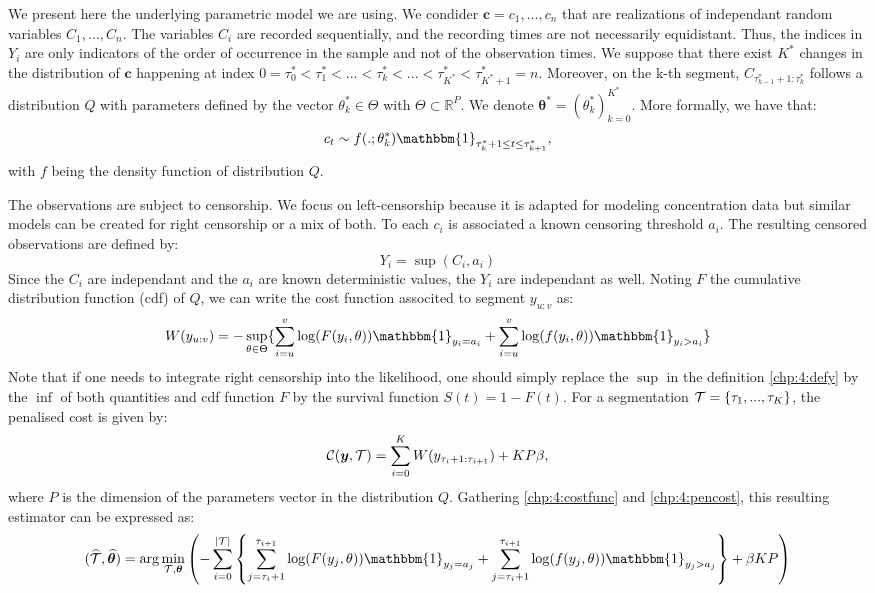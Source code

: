 We present here the underlying parametric model we are using. We condider $\bm c = c_1,\dots,c_n$ that are realizations of independant random variables $C_1,\dots,C_n$. The variables $C_i$ are recorded sequentially, and the recording times are not necessarily equidistant. Thus, the indices in $Y_i$ are only indicators of the order of occurrence in the sample and not of the observation times. We suppose that there exist $K^*$ changes in the distribution of $\bm c$ happening at index $0=\tau_0^*<\tau^*_1 <... < \tau^*_k <... < \tau^*_{K^*}<\tau^*_{K^*+1}=n$. Moreover, on the k-th segment, $C_{\tau^*_{k-1}+1:\tau^*_{k}}$ follows a distribution $Q$ with parameters defined by the vector $\theta^*_k\in\Theta$ with $\Theta\subset\mathbb{R}^P$. We denote $\bm{\theta^*} = (\theta^*_k)_{k=0}^{K^*}$. More formally, we have that:  
$$c_t \sim f(.;\theta^*_k)\mathbbm{1}_{\tau^*_{k}+1\leq t \leq \tau^*_{k+1}},$$
with $f$ being the density function of distribution $Q$.  


The observations are subject to censorship. We focus on left-censorship because it is adapted for modeling concentration data but similar models can be created for right censorship or a mix of both. To each $c_i$ is associated a known censoring threshold $a_i$. The resulting censored observations are defined by:  
\begin{equation}\label{chp:4:defy}
Y_i = \sup(C_i,a_i)
\end{equation}
Since the $C_i$ are independant and the $a_i$ are known deterministic values, the $Y_i$ are independant as well. Noting $F$ the cumulative distribution function (cdf) of $Q$, we can write the cost function associted to segment $y_{u:v}$ as:  
\begin{equation}\label{chp:4:costfunc}
W(y_{u:v}) = -\sup_{\theta \in \Theta}\{\sum_{i=u}^v\log(F(y_i,\theta))\mathbbm{1}_{y_i=a_i}+\sum_{i=u}^v\log(f(y_i,\theta))\mathbbm{1}_{y_i>a_i}\}
\end{equation}
Note that if one needs to integrate right censorship into the likelihood, one should simply replace the $\sup$ in the definition \ref{chp:4:defy} by the $\inf$ of both quantities and cdf function $F$ by the survival function $S(t)=1-F(t)$. 
For a segmentation ${\mathcal T} = \{\tau_1,...,\tau_K\}$, the penalised cost is given by: 
\begin{equation}\label{chp:4:pencost}
{\mathcal C}(\bm y,{\mathcal T})=\sum_{i=0}^{K}  W(y_{\tau_i+1:\tau_{i+1}}) + KP\beta,
\end{equation}
where $P$ is the dimension of the parameters vector in the distribution $Q$. Gathering \ref{chp:4:costfunc} and \ref{chp:4:pencost}, this resulting estimator can be expressed as:  
\begin{equation}\label{chp:4:estim}
(\widehat{\TT},\widehat{\bm \theta}) = \arg\min_{\TT,\bm \theta} \left(- \sum_{i=0}^{\lvert \TT \rvert}  \left\{\sum_{j=\tau_i+1}^{\tau_{i+1}}\log(F(y_j,\theta))\mathbbm{1}_{y_j=a_j}+\sum_{j=\tau_i+1}^{\tau_{i+1}}\log(f(y_j,\theta))\mathbbm{1}_{y_j>a_j}\right\}+\beta KP\right)
\end{equation}


